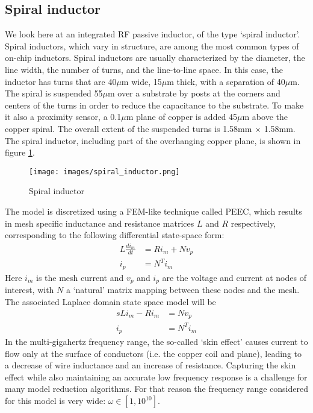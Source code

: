 \documentclass{article}
\begin{document}
	\subsection{Spiral inductor}
	We look here at an integrated RF passive inductor, of the type `spiral inductor'. Spiral inductors, which vary in structure, are among the most common types of on-chip inductors. Spiral inductors are usually characterized by the diameter, the line width, the number of turns, and the line-to-line space. In this case, the inductor has turns that are 40$\mu$m wide, 15$\mu$m thick, with a separation of 40$\mu$m. The spiral is suspended 55$\mu$m over a substrate by posts at the corners and centers of the turns in order to reduce the capacitance to the substrate. To make it also a proximity sensor, a 0.1$\mu$m plane of copper is added 45$\mu$m above the copper spiral.
	The overall extent of the suspended turns is 1.58mm × 1.58mm. The spiral inductor, including
	part of the overhanging copper plane, is shown in figure \ref{fig:PEEC}. 
	\begin{figure}[h]
		\center
		\texttt{[image: images/spiral\_inductor.png]}
		\caption{Spiral inductor}\label{fig:PEEC}
	\end{figure}
	The model is discretized using a FEM-like technique called PEEC, which results in mesh specific inductance and resistance matrices $L$ and $R$ respectively, corresponding to the following differential state-space form:
	\begin{align*}
		L\frac{di_m}{dt}&=Ri_m+Nv_p\\
		i_p&=N^Ti_m
	\end{align*}
	Here $i_m$ is the mesh current and $v_p$ and $i_p$ are the voltage and current at nodes of interest, with $N$ a `natural' matrix mapping between these nodes and the mesh.
	The associated Laplace domain state space model will be
	\begin{equation}
		\begin{aligned}
			sL i_m - R i_m &= N v_p\\
			i_p&=N^Ti_m
		\end{aligned}
	\end{equation} 
	In the multi-gigahertz frequency range, the so-called `skin effect' causes current to
	flow only at the surface of conductors (i.e. the copper coil and plane), leading to a decrease of wire
	inductance and an increase of resistance. Capturing the skin eﬀect while also maintaining an accurate low frequency response is a challenge for many model reduction algorithms. For that reason the frequency range considered for this model is very wide: $\omega\in[1,10^{10}]$.
	
\end{document}
